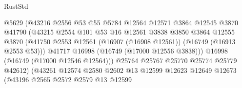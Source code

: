 \begin{lexlean}{RustStd}
\begin{coremodule}
                                      @5629
                                      (@43216
                                        @2556
                                        @53
                                        @55
                                        @5784
                                        @12564
                                        @12571
                                        @3864
                                        @12545
                                        @3870
                                        @41790
                                        (@43215
                                          @2554
                                          @101
                                          @53
                                          @16
                                          @12561
                                          @3838
                                          @3850
                                          @3864
                                          @12555
                                          @3870
                                          (@41750
                                            @2553
                                            @12561
                                            (@16907 (@16908 @12561))
                                            (@16749 (@16913 @2553 @53)))
                                          @41717
                                          @16998
                                          (@16749 (@17000 @12556 @3838)))
                                        @16998
                                        (@16749 (@17000 @12546 @12564)))
                                      @25764
                                      @25767
                                      @25770
                                      @25774
                                      @25779
                                      @42612)
                                    (@43261
                                      @12574
                                      @2580
                                      @2602
                                      @13
                                      @12599
                                      @12623
                                      @12649
                                      @12673
                                      (@43196
                                        @2565
                                        @2572
                                        @2579
                                        @13
                                        @12599

\end{coremodule}
\end{lexlean}
